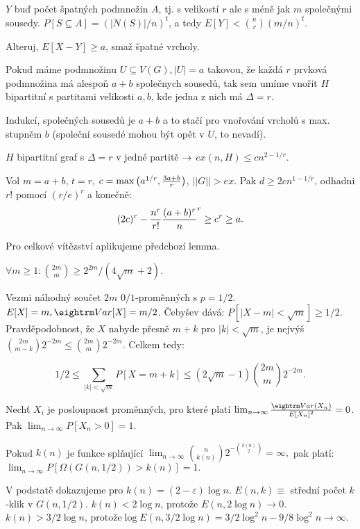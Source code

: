 $Y$ buď počet špatných podmnožin $A$, tj. s velikostí $r$ ale s méně jak $m$ společnými
sousedy. $P[S \subseteq A] = (|N(S)|/n)^t$, a tedy $E[Y] < {n \choose r} \left(m/n\right)^t$.

Alteruj,  $E[X-Y] \ge a$, smaž špatné vrcholy.

\lem{} Pokud máme podmnožinu $U \subseteq V(G), |U|=a$ takovou, že každá $r$ prvková podmnožina
má alespoň $a+b$ společnych sousedů, tak sem umíme vnořit $H$ bipartitní s partitami velikosti
$a,b$, kde jedna z nich má $\Delta = r$.

\prf{} Indukcí, společných sousedů je $a+b$ a to stačí pro vnořování vrcholů s max. stupněm
$b$ (společní sousedé mohou být opět v $U$, to nevadí).

\thm{} $H$ bipartitní graf s $\Delta = r$ v jedné partitě $\rightarrow$ $ex(n,H) \le cn^{2-1/r}$.

\prf{} Vol $m = a+b$, $t = r$, $c = \max\left(a^{1/r},{3a+b \over r}\right)$, $||G|| > ex$.
Pak $d \ge 2cn^{1-1/r}$, odhadni $r!$ pomocí $(r/e)^r$ a konečně:
$$ (2c)^r - {n^r \over r!} {(a+b)^r \over n}^r \ge c^r \ge a. $$

Pro celkové vítězství aplikujeme předchozí lemma.


\thm{} $\forall m\ge 1: {2m \choose m} \ge 2^{2m}/(4\sqrt{m}+2)$.

\prf{} Vezmi náhodný součet $2m$ $0/1$-proměnných s $p=1/2$. $E[X] = m, \var[X] = m/2$. Čebyšev dává: $P[|X-m| < \sqrt{m}] \ge 1/2$. 
Pravděpodobnost, že $X$ nabyde přesně $m+k$ pro $|k| < \sqrt{m}$, 
je nejvýš ${2m \choose m-k}2^{-2m} \le {2m \choose m}2^{-2m}$.
Celkem tedy:

$$1/2 \le \sum_{|k| < \sqrt{m}} P[X = m+k] \le (2\sqrt{m} -1) {2m \choose m} 2^{-2m}.$$

 Nechť $X_i$ je posloupnost proměnných, pro které platí $\lim_{n \rightarrow \infty} {\var(X_n) \over E[X_n]^2} = 0$.
Pak $\lim_{n \rightarrow \infty} P[X_n > 0] = 1.$

\lem{} Pokud $k(n)$ je funkce splňující
$ \lim_{n \rightarrow \infty} {n \choose k(n)} 2^{-{k(n) \choose 2}} = \infty, $
pak platí:
$ \lim_{n \rightarrow \infty} P[\Omega(G(n,1/2)) > k(n)] = 1.$

\prf{} V podstatě dokazujeme pro $k(n) = (2-\varepsilon) \log n$. $E(n,k) \equiv$
střední počet $k$-klik v $G(n,1/2)$.  $k(n) < 2 \log n$, protože $E(n,2 \log n)
\rightarrow 0$. $k(n) > 3/2 \log n$, protože\hfil\break $\log E(n,3/2 \log n) = 3/2 \log^2
n - 9/8 \log^2 n \rightarrow \infty$.

